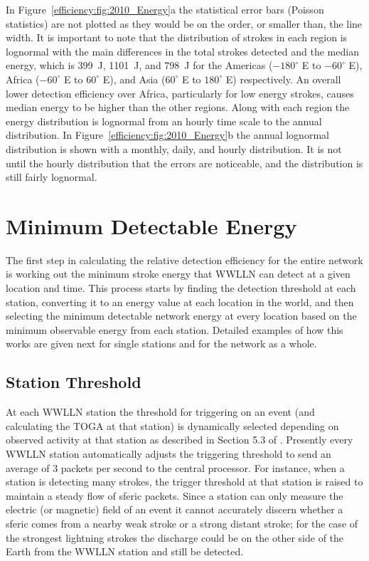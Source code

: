 In Figure~\ref{efficiency:fig:2010_Energy}a the statistical error bars (Poisson statistics) are not plotted as they would be on the order, or smaller than, the line width.
It is important to note that the distribution of strokes in each region is lognormal \citep{Hutchins2012} with the main differences in the total strokes detected and the median energy, which is 399~J, 1101~J, and 798~J for the Americas ($-180^\circ$ E to $-60^\circ$ E), Africa ($-60^\circ$ E to $60^\circ$ E), and Asia ($60^\circ$ E to $180^\circ$ E) respectively.
An overall lower detection efficiency over Africa, particularly for low energy strokes, causes median energy to be higher than the other regions.
Along with each region the energy distribution is lognormal from an hourly time scale to the annual distribution.
In Figure~\ref{efficiency:fig:2010_Energy}b the annual lognormal distribution is shown with a monthly, daily, and hourly distribution.
It is not until the hourly distribution that the errors are noticeable, and the distribution is still fairly lognormal.

\section{Minimum Detectable Energy}

The first step in calculating the relative detection efficiency for the entire network is working out the minimum stroke energy that WWLLN can detect at a given location and time.
This process starts by finding the detection threshold at each station, converting it to an energy value at each location in the world, and then selecting the minimum detectable network energy at every location based on the minimum observable energy from each station.
Detailed examples of how this works are given next for single stations and for the network as a whole.

\subsection{Station Threshold}

At each WWLLN station the threshold for triggering on an event (and calculating the TOGA at that station) is dynamically selected depending on observed activity at that station as described in Section 5.3 of \citet{Rodger2006}.
Presently every WWLLN station automatically adjusts the triggering threshold to send an average of 3 packets per second to the central processor.
For instance, when a station is detecting many strokes, the trigger threshold at that station is raised to maintain a steady flow of sferic packets.
Since a station can only measure the electric (or magnetic) field of an event it cannot accurately discern whether a sferic comes from a nearby weak stroke or a strong distant stroke; for the case of the strongest lightning strokes the discharge could be on the other side of the Earth from the WWLLN station and still be detected.


